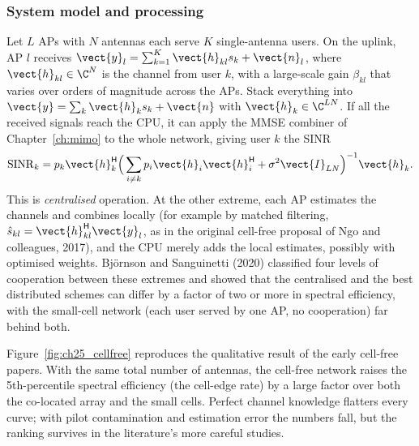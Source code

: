 \subsubsection{System model and processing}
Let $L$ APs with $N$ antennas each serve $K$ single-antenna users. On the uplink, AP $l$ receives
$\vect{y}_l=\sum_{k=1}^{K}\vect{h}_{kl}s_k+\vect{n}_l$, where $\vect{h}_{kl}\in\C^N$ is the channel
from user $k$, with a large-scale gain $\beta_{kl}$ that varies over orders of magnitude across the
APs. Stack everything into $\vect{y}=\sum_k\vect{h}_ks_k+\vect{n}$ with $\vect{h}_k\in\C^{LN}$. If all
the received signals reach the CPU, it can apply the MMSE combiner of Chapter~\ref{ch:mimo} to the
whole network, giving user $k$ the SINR
\begin{equation}
\mathrm{SINR}_k=p_k\vect{h}_k^{\mathsf H}\Big(\sum_{i\ne k}p_i\vect{h}_i\vect{h}_i^{\mathsf
H}+\sigma^2\vect{I}_{LN}\Big)^{-1}\vect{h}_k.
\label{eq:ch25:cfsinr}
\end{equation}
This is \emph{centralised} operation. At the other extreme, each AP estimates the channels and
combines locally (for example by matched filtering, $\hat s_{kl}=\vect{h}_{kl}^{\mathsf H}\vect{y}_l$, as
in the original cell-free proposal of Ngo and colleagues, 2017), and the CPU merely adds the local
estimates, possibly with optimised weights. Bj\"ornson and Sanguinetti (2020) classified four levels
of cooperation between these extremes and showed that the centralised and the best distributed
schemes can differ by a factor of two or more in spectral efficiency, with the small-cell network
(each user served by one AP, no cooperation) far behind both.

Figure~\ref{fig:ch25_cellfree} reproduces the qualitative result of the early cell-free papers. With
the same total number of antennas, the cell-free network raises the 5th-percentile spectral efficiency
(the cell-edge rate) by a large factor over both the co-located array and the small cells. Perfect
channel knowledge flatters every curve; with pilot contamination and estimation error the numbers
fall, but the ranking survives in the literature's more careful studies.

